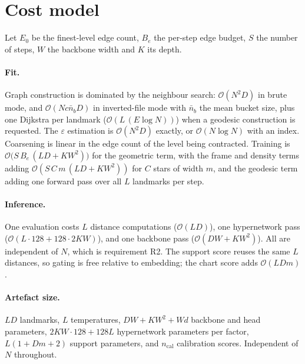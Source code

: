 \documentclass[12pt]{iopart}
\theoremstyle{definition}
\theoremstyle{plain}
\theoremstyle{remark}
\begin{document}
\section{Cost model}
\label{app:cost}

Let $E_0$ be the finest-level edge count, $B_e$ the per-step edge budget, $S$
the number of steps, $W$ the backbone width and $K$ its depth.

\paragraph{Fit.}
Graph construction is dominated by the neighbour search: $\mathcal{O}(N^2D)$ in
brute mode, and $\mathcal{O}(N c \bar n_b D)$ in inverted-file mode with
$\bar n_b$ the mean bucket size, plus one Dijkstra per landmark
($\mathcal{O}(L\,(E\log N))$) when a geodesic construction is requested. The
$\varepsilon$ estimation is $\mathcal{O}(N^2D)$ exactly, or $\mathcal{O}(N\log
N)$ with an index. Coarsening is linear in the edge count of the level being
contracted. Training is $\mathcal{O}\bigl(S\,B_e\,(LD + KW^2)\bigr)$ for the
geometric term, with the frame and density terms adding
$\mathcal{O}(S\,C\,m\,(LD+KW^2))$ for $C$ stars of width $m$, and the geodesic
term adding one forward pass over all $L$ landmarks per step.

\paragraph{Inference.}
One evaluation costs $L$ distance computations ($\mathcal{O}(LD)$), one
hypernetwork pass ($\mathcal{O}(L\cdot 128 + 128\cdot 2KW)$), and one backbone
pass ($\mathcal{O}(DW+KW^2)$). All are independent of $N$, which is requirement
R2. The support score reuses the same $L$ distances, so gating is free relative
to embedding; the chart score adds $\mathcal{O}(LDm)$.

\paragraph{Artefact size.}
$LD$ landmarks, $L$ temperatures, $DW+KW^2+Wd$ backbone and head parameters,
$2KW\cdot 128 + 128L$ hypernetwork parameters per factor, $L(1+Dm+2)$ support
parameters, and $n_{\mathrm{cal}}$ calibration scores. Independent of $N$
throughout.
\end{document}
